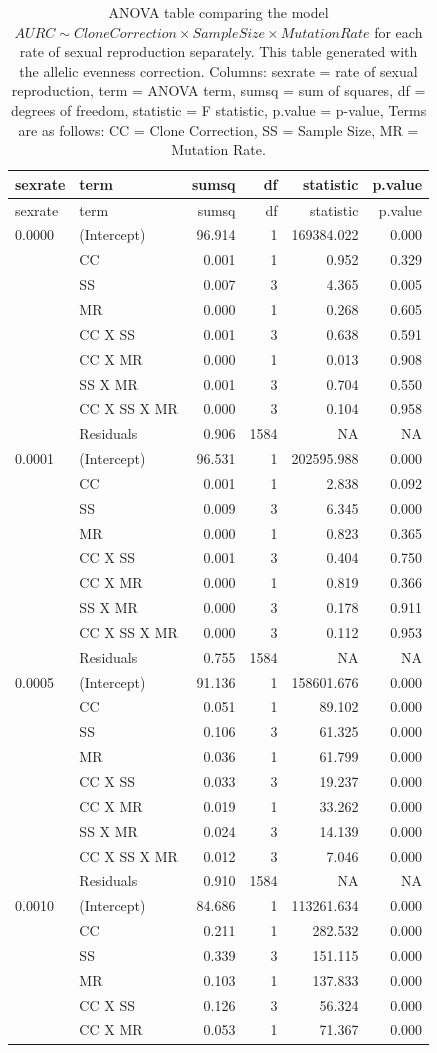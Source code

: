 \documentclass[double,11pt]{beavtex}
\begin{document}
  \begin{longtable}[]{@{}llrrrr@{}}
  \caption{\label{tab:sim4} ANOVA table comparing the model
  \(AURC \sim Clone Correction \times Sample Size \times Mutation Rate\)
  for each rate of sexual reproduction separately. This table generated
  with the allelic evenness correction. Columns: sexrate = rate of sexual
  reproduction, term = ANOVA term, sumsq = sum of squares, df = degrees of
  freedom, statistic = F statistic, p.value = p-value, Terms are as
  follows: CC = Clone Correction, SS = Sample Size, MR = Mutation
  Rate.}\tabularnewline
  \toprule
  sexrate & term & sumsq & df & statistic & p.value\tabularnewline
  \midrule
  \endfirsthead
  \toprule
  sexrate & term & sumsq & df & statistic & p.value\tabularnewline
  \midrule
  \endhead
  0.0000 & (Intercept) & 96.914 & 1 & 169384.022 & 0.000\tabularnewline
  & CC & 0.001 & 1 & 0.952 & 0.329\tabularnewline
  & SS & 0.007 & 3 & 4.365 & 0.005\tabularnewline
  & MR & 0.000 & 1 & 0.268 & 0.605\tabularnewline
  & CC X SS & 0.001 & 3 & 0.638 & 0.591\tabularnewline
  & CC X MR & 0.000 & 1 & 0.013 & 0.908\tabularnewline
  & SS X MR & 0.001 & 3 & 0.704 & 0.550\tabularnewline
  & CC X SS X MR & 0.000 & 3 & 0.104 & 0.958\tabularnewline
  & Residuals & 0.906 & 1584 & NA & NA\tabularnewline
  0.0001 & (Intercept) & 96.531 & 1 & 202595.988 & 0.000\tabularnewline
  & CC & 0.001 & 1 & 2.838 & 0.092\tabularnewline
  & SS & 0.009 & 3 & 6.345 & 0.000\tabularnewline
  & MR & 0.000 & 1 & 0.823 & 0.365\tabularnewline
  & CC X SS & 0.001 & 3 & 0.404 & 0.750\tabularnewline
  & CC X MR & 0.000 & 1 & 0.819 & 0.366\tabularnewline
  & SS X MR & 0.000 & 3 & 0.178 & 0.911\tabularnewline
  & CC X SS X MR & 0.000 & 3 & 0.112 & 0.953\tabularnewline
  & Residuals & 0.755 & 1584 & NA & NA\tabularnewline
  0.0005 & (Intercept) & 91.136 & 1 & 158601.676 & 0.000\tabularnewline
  & CC & 0.051 & 1 & 89.102 & 0.000\tabularnewline
  & SS & 0.106 & 3 & 61.325 & 0.000\tabularnewline
  & MR & 0.036 & 1 & 61.799 & 0.000\tabularnewline
  & CC X SS & 0.033 & 3 & 19.237 & 0.000\tabularnewline
  & CC X MR & 0.019 & 1 & 33.262 & 0.000\tabularnewline
  & SS X MR & 0.024 & 3 & 14.139 & 0.000\tabularnewline
  & CC X SS X MR & 0.012 & 3 & 7.046 & 0.000\tabularnewline
  & Residuals & 0.910 & 1584 & NA & NA\tabularnewline
  0.0010 & (Intercept) & 84.686 & 1 & 113261.634 & 0.000\tabularnewline
  & CC & 0.211 & 1 & 282.532 & 0.000\tabularnewline
  & SS & 0.339 & 3 & 151.115 & 0.000\tabularnewline
  & MR & 0.103 & 1 & 137.833 & 0.000\tabularnewline
  & CC X SS & 0.126 & 3 & 56.324 & 0.000\tabularnewline
  & CC X MR & 0.053 & 1 & 71.367 & 0.000\tabularnewline

\end{longtable}
\end{document}
